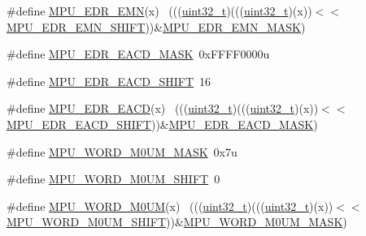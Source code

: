 \begin{DoxyCompactItemize}
\#define \hyperlink{group___m_p_u___register___masks_ga96dd5486570e5f2b830023213e5bcefc}{M\+P\+U\+\_\+\+E\+D\+R\+\_\+\+E\+MN}(x)                                                  ~(((\hyperlink{_p_e___types_8h_a33594304e786b158f3fb30289278f5af}{uint32\+\_\+t})(((\hyperlink{_p_e___types_8h_a33594304e786b158f3fb30289278f5af}{uint32\+\_\+t})(x))$<$$<$\hyperlink{group___m_p_u___register___masks_gad27c9ef1ae37201a6c16976311c5e1b3}{M\+P\+U\+\_\+\+E\+D\+R\+\_\+\+E\+M\+N\+\_\+\+S\+H\+I\+FT}))\&\hyperlink{group___m_p_u___register___masks_ga57901086814557690f671d195d886423}{M\+P\+U\+\_\+\+E\+D\+R\+\_\+\+E\+M\+N\+\_\+\+M\+A\+SK})
\item 
\#define \hyperlink{group___m_p_u___register___masks_ga68e110ced075e97030f5c5a2f0cda968}{M\+P\+U\+\_\+\+E\+D\+R\+\_\+\+E\+A\+C\+D\+\_\+\+M\+A\+SK}~0x\+F\+F\+F\+F0000u
\item 
\#define \hyperlink{group___m_p_u___register___masks_gac82a810678a3390409319ea636e93d84}{M\+P\+U\+\_\+\+E\+D\+R\+\_\+\+E\+A\+C\+D\+\_\+\+S\+H\+I\+FT}~16
\item 
\#define \hyperlink{group___m_p_u___register___masks_ga9ce24407fd20ff7c01bbf20cd7ac483b}{M\+P\+U\+\_\+\+E\+D\+R\+\_\+\+E\+A\+CD}(x)                                                ~(((\hyperlink{_p_e___types_8h_a33594304e786b158f3fb30289278f5af}{uint32\+\_\+t})(((\hyperlink{_p_e___types_8h_a33594304e786b158f3fb30289278f5af}{uint32\+\_\+t})(x))$<$$<$\hyperlink{group___m_p_u___register___masks_gac82a810678a3390409319ea636e93d84}{M\+P\+U\+\_\+\+E\+D\+R\+\_\+\+E\+A\+C\+D\+\_\+\+S\+H\+I\+FT}))\&\hyperlink{group___m_p_u___register___masks_ga68e110ced075e97030f5c5a2f0cda968}{M\+P\+U\+\_\+\+E\+D\+R\+\_\+\+E\+A\+C\+D\+\_\+\+M\+A\+SK})
\item 
\#define \hyperlink{group___m_p_u___register___masks_ga81c4b50e1693f2f64236771f4588ce0e}{M\+P\+U\+\_\+\+W\+O\+R\+D\+\_\+\+M0\+U\+M\+\_\+\+M\+A\+SK}~0x7u
\item 
\#define \hyperlink{group___m_p_u___register___masks_ga636500a039c88639b9b03b0624e934ce}{M\+P\+U\+\_\+\+W\+O\+R\+D\+\_\+\+M0\+U\+M\+\_\+\+S\+H\+I\+FT}~0
\item 
\#define \hyperlink{group___m_p_u___register___masks_gac8ad5fbbc8d2e40ebb08b042feb3e74b}{M\+P\+U\+\_\+\+W\+O\+R\+D\+\_\+\+M0\+UM}(x)                                              ~(((\hyperlink{_p_e___types_8h_a33594304e786b158f3fb30289278f5af}{uint32\+\_\+t})(((\hyperlink{_p_e___types_8h_a33594304e786b158f3fb30289278f5af}{uint32\+\_\+t})(x))$<$$<$\hyperlink{group___m_p_u___register___masks_ga636500a039c88639b9b03b0624e934ce}{M\+P\+U\+\_\+\+W\+O\+R\+D\+\_\+\+M0\+U\+M\+\_\+\+S\+H\+I\+FT}))\&\hyperlink{group___m_p_u___register___masks_ga81c4b50e1693f2f64236771f4588ce0e}{M\+P\+U\+\_\+\+W\+O\+R\+D\+\_\+\+M0\+U\+M\+\_\+\+M\+A\+SK})
$$
\end{DoxyCompactItemize}
